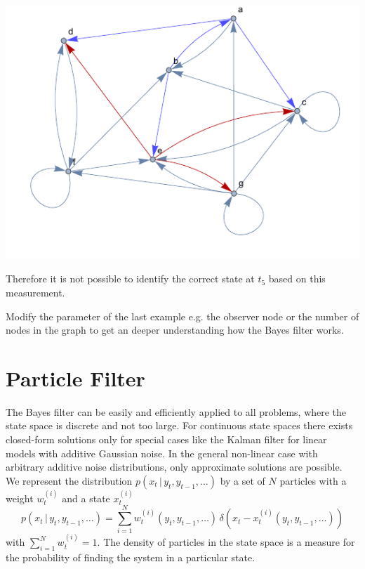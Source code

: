 \documentclass{tstextbook}
\begin{document}
\begin{example}
\includegraphics[scale=0.8, center]{images/highlighted_graph_world.pdf}

Therefore it is not possible to identify the correct state at $t_5$ based on this measurement.   

\end{example}

\begin{exercise}
Modify the parameter of the last example e.g. the observer node or the number of nodes in the graph to get an deeper understanding how the Bayes filter works.
\end{exercise}

\section{Particle Filter}
\label{se:particle_filter}

The Bayes filter can be easily and efficiently applied to all problems, where the state space is discrete and not too large. For continuous state spaces there exists closed-form solutions only for special cases like the Kalman filter for linear models with additive Gaussian noise. In the general non-linear case with arbitrary additive noise distributions, only approximate solutions are possible.\\

We represent the distribution $p(x_{t}\,\vert\, y_{t},y_{t-1},\ldots)$ by a set of $N$ particles with a weight $w^{(i)}_t$ and a state $x^{(i)}_t$ 
\begin{equation}
p(x_{t}\,\vert\, y_{t},y_{t-1},\ldots)=\sum_{i=1}^N w^{(i)}_t(y_{t},y_{t-1},\ldots) \,\delta\left(x_t - x^{(i)}_t(y_{t},y_{t-1},\ldots)\right)
\end{equation}
with $\sum_{i=1}^N w^{(i)}_t=1$. The density of particles in the state space is a measure for the probability of finding the system in a particular state.
\end{document}
